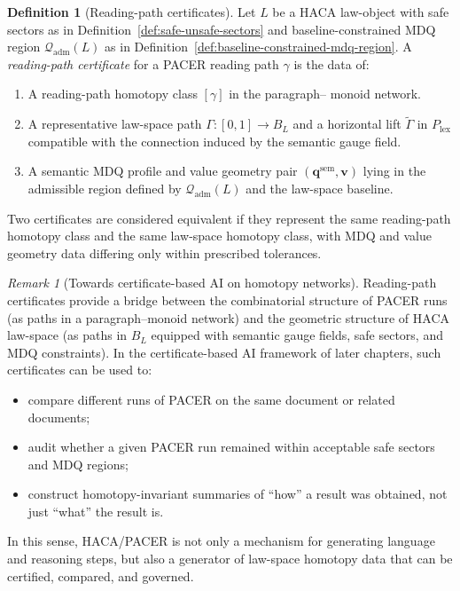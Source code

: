 \documentclass[11pt]{book}
\theoremstyle{plain}
\theoremstyle{definition}
\newtheorem{definition}[theorem]{Definition}
\theoremstyle{remark}
\newtheorem{remark}[theorem]{Remark}
\begin{document}
\begin{definition}[Reading-path certificates]
\label{def:reading-path-certificate}
Let $L$ be a HACA law-object with safe sectors as in
Definition~\ref{def:safe-unsafe-sectors} and baseline-constrained MDQ
region $\mathcal{Q}_{\mathrm{adm}}(L)$ as in
Definition~\ref{def:baseline-constrained-mdq-region}. A
\emph{reading-path certificate} for a PACER reading path $\gamma$ is
the data of:
\begin{enumerate}
  \item A reading-path homotopy class $[\gamma]$ in the paragraph–
        monoid network.
  \item A representative law-space path $\Gamma:[0,1]\to B_L$ and a
        horizontal lift $\tilde{\Gamma}$ in $P_{\mathrm{lex}}$
        compatible with the connection induced by the semantic gauge
        field.
  \item A semantic MDQ profile and value geometry pair
        $(\mathbf{q}^{\mathrm{sem}},\mathbf{v})$ lying in the
        admissible region defined by
        $\mathcal{Q}_{\mathrm{adm}}(L)$ and the law-space baseline.
\end{enumerate}
Two certificates are considered equivalent if they represent the same
reading-path homotopy class and the same law-space homotopy class,
with MDQ and value geometry data differing only within prescribed
tolerances.
\end{definition}

\begin{remark}[Towards certificate-based AI on homotopy networks]
\label{rem:cert-based-ai-homotopy-network}
Reading-path certificates provide a bridge between the combinatorial
structure of PACER runs (as paths in a paragraph–monoid network) and
the geometric structure of HACA law-space (as paths in $B_L$ equipped
with semantic gauge fields, safe sectors, and MDQ constraints). In the
certificate-based AI framework of later chapters, such certificates
can be used to:
\begin{itemize}
  \item compare different runs of PACER on the same document or
        related documents;
  \item audit whether a given PACER run remained within acceptable
        safe sectors and MDQ regions;
  \item construct homotopy-invariant summaries of ``how'' a result was
        obtained, not just ``what'' the result is.
\end{itemize}
In this sense, HACA/PACER is not only a mechanism for generating
language and reasoning steps, but also a generator of law-space
homotopy data that can be certified, compared, and governed.
\end{remark}
\end{document}
